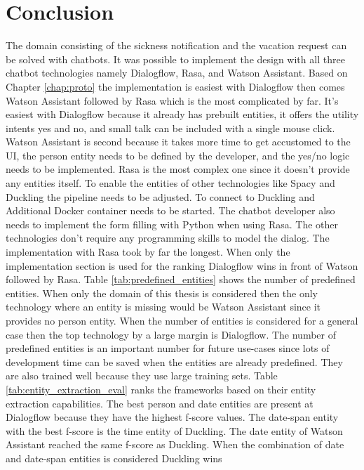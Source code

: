 \section{Conclusion}
The domain consisting of the sickness notification and the vacation request 
can be solved with chatbots.
It was possible to implement the design with all three chatbot 
technologies namely Dialogflow, Rasa, and Watson Assistant.
Based on Chapter \ref{chap:proto} the implementation is 
easiest with Dialogflow then comes Watson Assistant followed by 
Rasa which is the most complicated by far.
It's easiest with Dialogflow because it already has prebuilt entities,
it offers the utility intents yes and no, and small talk can be 
included with a single mouse click.
Watson Assistant is second because it takes more time to get accustomed 
to the UI, the person entity needs to be defined by the developer,
and the yes/no logic needs to be implemented.
Rasa is the most complex one since it doesn't provide any entities 
itself.
To enable the entities of other technologies like Spacy and Duckling the 
pipeline needs to be adjusted.
To connect to Duckling and Additional Docker container needs to be started.
The chatbot developer also needs to implement the form filling with Python 
when using Rasa. 
The other technologies don't require any programming skills to model the 
dialog.
The implementation with Rasa took by far the longest.
When only the implementation section is used for the ranking 
Dialogflow wins in front of Watson followed by Rasa.
Table \ref{tab:predefined_entities} shows the number of predefined entities.
When only the domain of this thesis is considered then the only technology 
where an entity is missing would be Watson Assistant since it provides no person entity.
When the number of entities is considered for a general case then the 
top technology by a large margin is Dialogflow.
The number of predefined entities is an important number for future use-cases since 
lots of development time can be saved when the entities are already predefined.
They are also trained well because they use large training sets.
Table \ref{tab:entity_extraction_eval} ranks the frameworks based on their 
entity extraction capabilities.
The best person and date entities are present at Dialogflow because they have the 
highest f-score values.
The date-span entity with the best f-score is the time entity of Duckling.
The date entity of Watson Assistant reached the same f-score as Duckling.
When the combination of date and date-span entities is considered Duckling wins 
